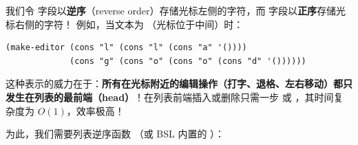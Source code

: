\begin{notebox}
我们令  字段以\textbf{逆序}（reverse order）存储光标左侧的字符，而  字段以\textbf{正序}存储光标右侧的字符！
例如，当文本为 （光标位于中间）时：
\begin{lstlisting}[language=BSL]
(make-editor (cons "l" (cons "l" (cons "a" '())))
             (cons "g" (cons "o" (cons "o" (cons "d" '())))))
\end{lstlisting}
这种表示的威力在于：\textbf{所有在光标附近的编辑操作（打字、退格、左右移动）都只发生在列表的最前端（head）}！在列表前端插入或删除只需一步  或 ，其时间复杂度为 $O(1)$，效率极高！
\end{notebox}

为此，我们需要列表逆序函数 （或 BSL 内置的 ）：
